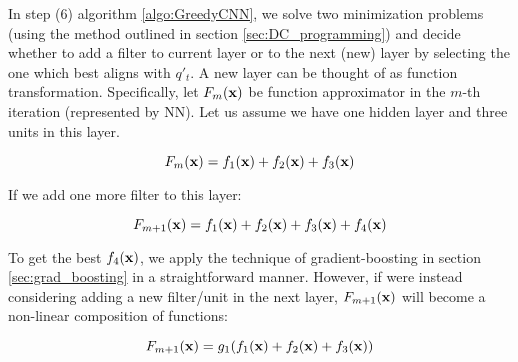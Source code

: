 \documentclass{article}
\begin{document}
\iffalse
\begin{algorithm}
\caption{{\bf IncrementalCNN}}\label{incremental_algo}
\begin{algorithmic}
\STATE {\bf Input:} Training dataset $D = \{(X_1, y_1), \dots, (X_n, y_n)\}$, convex loss function $Q$, and scalar regularization penalty $\lambda$. $s$ is ReLU
\STATE $f_1, p_1$ = FindBestFilterPoolSize(1)
\STATE Select $V_1$ to some initial value and select $W_1 = argmin_{W1} \sum_t Q(W_1.POOL(s(V_1 * X)), y_t) + \lambda |W_1|$
\FOR{$i = 2,3 .., $}
\STATE Let $q_t = Q'(\sum_{j = 1}^{i - 1} W_j . POOL(s(V_j * X), y_t)$ 
\STATE $f_i, p_i$ = FindBestFilterPoolSize($i$)
\STATE Select best $V_i$ by maximizing $\sum_{t} q_t POOL(s(V_i * X))$ using BCFW
\STATE If $\sum_{t} q_t POOL(s(V_i * X)) < \lambda$, {\bf stop}
\STATE Select $W_1, ...., W_i$ by minimizing $C =  \sum_t Q(\sum_{j = 1}^{i} W_j . POOL(s(V_j * X)), y_t) + \lambda \sum_{j = 1}^{i}|W_j|$
\ENDFOR
\end{algorithmic}
\end{algorithm}
\fi

In step (6) algorithm \ref{algo:GreedyCNN}, we solve two minimization problems (using the method outlined in section \ref{sec:DC_programming}) and decide whether to add a filter to current layer or to the next (new) layer by selecting the one which best aligns with $q'_t$. A new layer can be thought of as function transformation. Specifically, let $F_m({\bf x})$ be function approximator in the $m$-th iteration (represented by NN). Let us assume we have one hidden layer and three units in this layer.

\begin{equation}
F_m({\bf x}) = f_1({\bf x})+ f_2({\bf x})  + f_3({\bf x})
\end{equation}

If we add one more filter to this layer:

\begin{equation}
F_{m+1}({\bf x}) = f_1({\bf x})+ f_2({\bf x})  + f_3({\bf x}) + f_4({\bf x})
\end{equation}

To get the best $f_4({\bf x})$, we apply the technique of gradient-boosting in section \ref{sec:grad_boosting} in a straightforward manner. However, if were instead considering adding a new filter/unit in the next layer, $F_{m+1}({\bf x})$ will become a non-linear composition of functions:

\begin{equation}
F_{m+1}({\bf x}) = g_1(f_1({\bf x})+ f_2({\bf x})  + f_3({\bf x}))
\end{equation}
\end{document}
